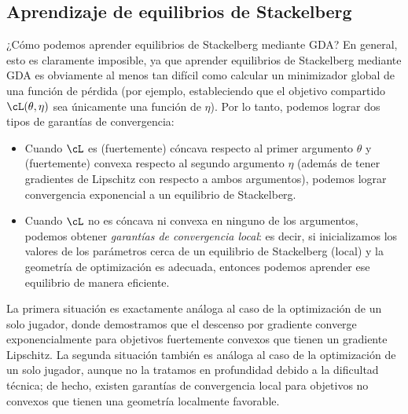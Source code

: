 \documentclass[../../book-main_es.tex]{subfiles}
\begin{document}
\subsection{Aprendizaje de equilibrios de Stackelberg}

¿Cómo podemos aprender equilibrios de Stackelberg mediante GDA? En general, esto es
claramente imposible, ya que aprender equilibrios de Stackelberg mediante GDA es
obviamente al menos tan difícil como calcular un minimizador global de una función de pérdida
(por ejemplo, estableciendo que el objetivo compartido \(\cL(\theta, \eta)\)
sea únicamente una función de \(\eta\)). Por lo tanto, podemos lograr dos tipos
de garantías de convergencia:
\begin{itemize}
    \item Cuando \(\cL\) es (fuertemente) cóncava respecto al primer argumento
        \(\theta\) y (fuertemente) convexa respecto al segundo argumento
        \(\eta\) (además de tener gradientes de Lipschitz con respecto a ambos
        argumentos), podemos lograr convergencia exponencial a
        un equilibrio de Stackelberg.
    \item Cuando \(\cL\) no es cóncava ni convexa en ninguno de los argumentos,
        podemos obtener \textit{garantías de convergencia local}: es decir,
        si inicializamos los valores de los parámetros cerca de un equilibrio
        de Stackelberg (local) y la geometría de optimización es adecuada,
        entonces podemos aprender ese equilibrio de manera eficiente.
\end{itemize}

La primera situación es exactamente análoga al caso de
la optimización de un solo jugador, donde demostramos que el descenso por gradiente
converge exponencialmente para objetivos fuertemente convexos que
tienen un gradiente Lipschitz. La segunda situación también es análoga al
caso de la optimización de un solo jugador, aunque no la tratamos
en profundidad debido a la dificultad técnica; de hecho, existen garantías de
convergencia local para objetivos no convexos que tienen una geometría
localmente favorable.
\end{document}
